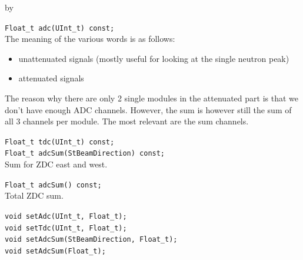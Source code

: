 \documentclass[twoside]{article}
\newcommand{\entrylabel}[1]{\mbox{\textbf{{#1}}}\hfil}%
\newenvironment{entry}
{\begin{list}{}%
    {\renewcommand{\makelabel}{\entrylabel}%
     \setlength{\labelwidth}{90pt}%
     \setlength{\leftmargin}{\labelwidth}
     \advance\leftmargin by \labelsep%
      }%
    }%
  {\end{list}}
\newcommand{\Entrylabel}[1]%
{\raisebox{0pt}[1ex][0pt]{\makebox[\labelwidth][l]%
    {\parbox[t]{\labelwidth}{\hspace{0pt}\textbf{{#1}}}}}}
\newenvironment{Entry}%
{\renewcommand{\entrylabel}{\Entrylabel}\begin{entry}}%
  {\end{entry}}
\begin{document}
\begin{Entry}
    \verb+Float_t adc(UInt_t) const;+\\
    The meaning of the various words is as follows:
    \begin{itemize}
    \item unattenuated signals (mostly useful for looking at the single neutron peak)
    \item attenuated signals
    \end{itemize}
    
    The reason why there are only 2 single modules in the attenuated
    part is that we don't have enough ADC channels. However, the sum
    is however still the sum of all 3 channels per module. The most
    relevant are the sum channels.

    \verb+Float_t tdc(UInt_t) const;+\\

    \verb+Float_t adcSum(StBeamDirection) const;+\\
    Sum for ZDC east and west.
    
    \verb+Float_t adcSum() const;+\\
    Total ZDC sum.
    
    \verb+void setAdc(UInt_t, Float_t);+\\
    \verb+void setTdc(UInt_t, Float_t);+\\
    \verb+void setAdcSum(StBeamDirection, Float_t);+\\
    \verb+void setAdcSum(Float_t);+\\
\end{Entry}
\clearpage
\end{document}
